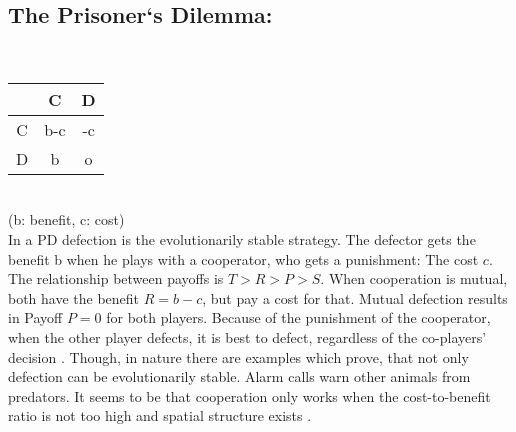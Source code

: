 \subsection{The Prisoner`s Dilemma:}
\newline\\
\begin{tabular}{|c|c|c|}
	\hline  & C & D \\ 
	\hline C & b-c & -c \\ 
	\hline D & b & o \\ 
	\hline 
\end{tabular} \\
(b: benefit, c: cost)
\newline\\
In a PD defection is the evolutionarily stable strategy. The defector gets the benefit b when he plays with a cooperator, who gets a punishment: The cost $c$. The relationship between payoffs is $T > R > P > S$. When cooperation is mutual, both have the benefit $R=b-c$, but pay a cost for that. Mutual defection results in Payoff $P = 0$ for both players. Because of the punishment of the cooperator, when the other player defects, it is best to defect, regardless of the co-players' decision \citep{HauertandDoebeli2004}. Though, in nature there are examples which prove, that not only defection can be evolutionarily stable. Alarm calls warn other animals from predators. It seems to be that cooperation only works when the cost-to-benefit ratio is not too high and spatial structure exists \citep{clutton1999}.

